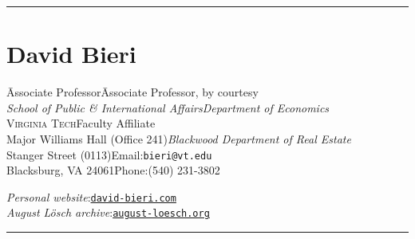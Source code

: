 \documentclass[letter,11pt]{article}
\newcommand{\HRule}{\rule{\linewidth}{0.2mm}}
\begin{document}
\thispagestyle{empty}
\noindent \HRule
\section*{\textbf{David Bieri}}

\begin{tabbing}
\noindent \=Associate Professor\hspace{5cm}\=Associate Professor, by courtesy\\
\>\emph{School of Public \& International Affairs}\>\emph{Department of Economics}\\[6pt]
\>\textsc{Virginia Tech}\>Faculty Affiliate\\
\>Major Williams Hall (Office 241)\>\emph{Blackwood Department of Real Estate}\\
 Stanger Street (0113)\>Email:\hspace{1.5ex}\texttt{bieri@vt.edu}\\
\>Blacksburg, VA 24061\>Phone:\hspace{1ex}(540) 231-3802\\
\end{tabbing}

\begin{tabbing}
\noindent \=\emph{Personal website}:\hspace{10ex}\=\href{http://www.david-bieri.com/}{\texttt{david-bieri.com}}\\[3pt]
\>\emph{August L\"{o}sch archive}:\>\href{https://www.august-loesch.org/}{\texttt{august-loesch.org}}\\
\end{tabbing}

\noindent \HRule
\end{document}

